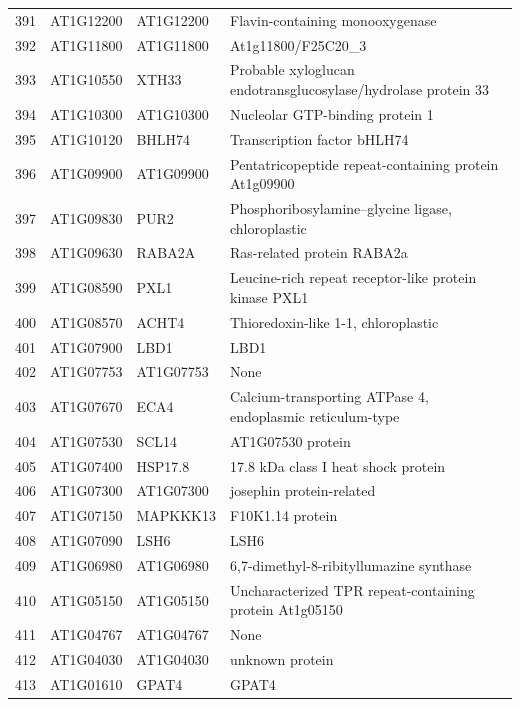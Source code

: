 \documentclass[11pt]{article}
\begin{document}
\begin{center}
\begin{tabular}{rlll}
391 & AT1G12200 & AT1G12200 & Flavin-containing monooxygenase\\
392 & AT1G11800 & AT1G11800 & At1g11800/F25C20\_3\\
393 & AT1G10550 & XTH33 & Probable xyloglucan endotransglucosylase/hydrolase protein 33\\
394 & AT1G10300 & AT1G10300 & Nucleolar GTP-binding protein 1\\
395 & AT1G10120 & BHLH74 & Transcription factor bHLH74\\
396 & AT1G09900 & AT1G09900 & Pentatricopeptide repeat-containing protein At1g09900\\
397 & AT1G09830 & PUR2 & Phosphoribosylamine--glycine ligase, chloroplastic\\
398 & AT1G09630 & RABA2A & Ras-related protein RABA2a\\
399 & AT1G08590 & PXL1 & Leucine-rich repeat receptor-like protein kinase PXL1\\
400 & AT1G08570 & ACHT4 & Thioredoxin-like 1-1, chloroplastic\\
401 & AT1G07900 & LBD1 & LBD1\\
402 & AT1G07753 & AT1G07753 & None\\
403 & AT1G07670 & ECA4 & Calcium-transporting ATPase 4, endoplasmic reticulum-type\\
404 & AT1G07530 & SCL14 & AT1G07530 protein\\
405 & AT1G07400 & HSP17.8 & 17.8 kDa class I heat shock protein\\
406 & AT1G07300 & AT1G07300 & josephin protein-related\\
407 & AT1G07150 & MAPKKK13 & F10K1.14 protein\\
408 & AT1G07090 & LSH6 & LSH6\\
409 & AT1G06980 & AT1G06980 & 6,7-dimethyl-8-ribityllumazine synthase\\
410 & AT1G05150 & AT1G05150 & Uncharacterized TPR repeat-containing protein At1g05150\\
411 & AT1G04767 & AT1G04767 & None\\
412 & AT1G04030 & AT1G04030 & unknown protein\\
413 & AT1G01610 & GPAT4 & GPAT4\\
\end{tabular}
\end{center}
\end{document}
